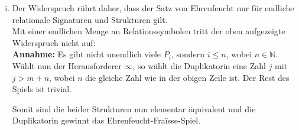 \documentclass[a4paper,10pt]{article}
\begin{document}
\begin{enumerate}[(i)]
\item
Der Widerspruch rührt daher, dass der Satz von Ehrenfeucht nur für endliche relationale Signaturen und Strukturen gilt. \\

Mit einer endlichen Menge an Relationssymbolen tritt der oben aufgezeigte Widerspruch nicht auf:\\
\textbf{Annahme:} Es gibt nicht unendlich viele $P_i$, sondern $i \le n$, wobei $n \in \mathbb{N}$.\\
Wählt nun der Herausforderer $\infty$, so wählt die Duplikatorin eine Zahl $j$ mit $j > m + n$, wobei $n$ die gleiche Zahl wie in der obigen Zeile ist.
Der Rest des Spiels ist trivial.

Somit sind die beider Strukturen nun elementar äquivalent und die Duplikatorin gewinnt das Ehrenfeucht-Fraïsse-Spiel.


	\end{enumerate}
\end{document}
